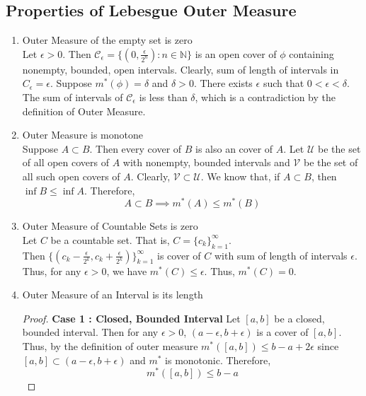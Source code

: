 \subsection{Properties of Lebesgue Outer Measure}
\begin{enumerate}
	\item Outer Measure of the empty set is zero\\
		Let $\epsilon > 0$. Then $\mathcal{C}_\epsilon = \{ (0,\frac{\epsilon}{2^n}) : n \in \mathbb{N} \}$ is an open cover of $\phi$ containing nonempty, bounded, open intervals. Clearly, sum of length of intervals in $C_\epsilon = \epsilon$. Suppose $m^\ast(\phi) = \delta$ and $\delta > 0$. There exists $\epsilon$ such that $0 < \epsilon < \delta$. The sum of intervals of $\mathcal{C}_\epsilon$ is less than $\delta$, which is a contradiction by the definition of Outer Measure.
	\item Outer Measure is monotone\\
		Suppose $A \subset B$. Then every cover of $B$ is also an  cover of $A$. Let $\mathcal{U}$ be the set of all open covers of $A$ with nonempty, bounded intervals and $\mathcal{V}$ be the set of all such open covers of $A$. Clearly, $\mathcal{V} \subset \mathcal{U}$. We know that, if $A \subset B$, then $\inf{B} \le \inf{A}$. Therefore,
	\begin{equation}
		A \subset B \implies m^\ast(A) \le m^\ast(B)
	\end{equation}
	\item Outer Measure of Countable Sets is zero\\
		Let $C$ be a countable set. That is, $C = \{ c_k \}_{k=1}^\infty$.\\
		Then $\{ (c_k-\frac{\epsilon}{2^k}, c_k + \frac{\epsilon}{2^k}) \}_{k=1}^\infty$ is cover of $C$ with sum of length of intervals $\epsilon$. Thus, for any $\epsilon > 0$, we have $m^\ast(C) \le \epsilon$. Thus, $m^\ast(C) = 0$.
	\item Outer Measure of an Interval is its length
	\begin{proof}
		\textbf{Case 1 : Closed, Bounded Interval}
		Let $[a,b]$ be a closed, bounded interval. Then for any $\epsilon > 0$, $(a-\epsilon,b+\epsilon)$ is a cover of $[a,b]$. Thus, by the definition of outer measure $m^\ast([a,b]) \le b-a+2\epsilon$ since $[a,b] \subset (a-\epsilon,b+\epsilon)$ and $m^\ast$ is monotonic. Therefore,
	\begin{equation}
		m^\ast([a,b]) \le b-a
	\end{equation}


\end{proof}
\end{enumerate}
